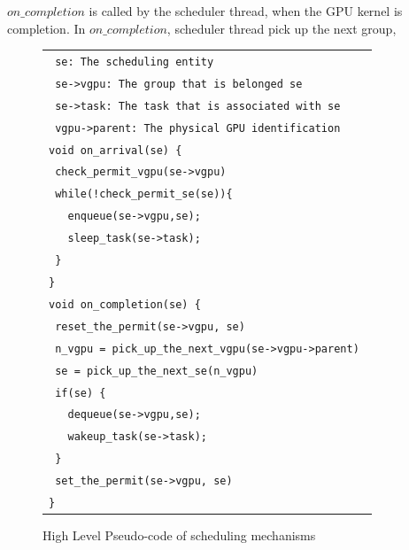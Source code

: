 $on\_completion$ is called by the scheduler thread, when the GPU kernel is completion.
In $on\_completion$, scheduler thread pick up the next group, 
\begin{figure}[t]
\begin{center}
\begin{tabular}{l}
\hline
{\scriptsize \verb| se: The scheduling entity |}\\
{\scriptsize \verb| se->vgpu: The group that is belonged se|}\\
{\scriptsize \verb| se->task: The task that is associated with se |}\\
{\scriptsize \verb| vgpu->parent: The physical GPU identification|}\\
\hline
{\scriptsize \verb|void on_arrival(se) {|}\\
{\scriptsize \verb| check_permit_vgpu(se->vgpu)    |}\\
{\scriptsize \verb| while(!check_permit_se(se)){|}\\
{\scriptsize \verb|   enqueue(se->vgpu,se); |}\\
{\scriptsize \verb|   sleep_task(se->task); |}\\
{\scriptsize \verb| }|}\\
{\scriptsize \verb|}|}\\
{\scriptsize \verb|void on_completion(se) {|}\\
{\scriptsize \verb| reset_the_permit(se->vgpu, se)|}\\
{\scriptsize \verb| n_vgpu = pick_up_the_next_vgpu(se->vgpu->parent) |}\\
{\scriptsize \verb| se = pick_up_the_next_se(n_vgpu)|}\\
{\scriptsize \verb| if(se) {|}\\
{\scriptsize \verb|   dequeue(se->vgpu,se);|}\\
{\scriptsize \verb|   wakeup_task(se->task);|}\\
{\scriptsize \verb| }|}\\
{\scriptsize \verb| set_the_permit(se->vgpu, se)|}\\
{\scriptsize \verb|}|}\\
\hline
\end{tabular}
\caption{High Level Pseudo-code of scheduling mechanisms}
\label{fig:scheduling}
\end{center}
\end{figure}

